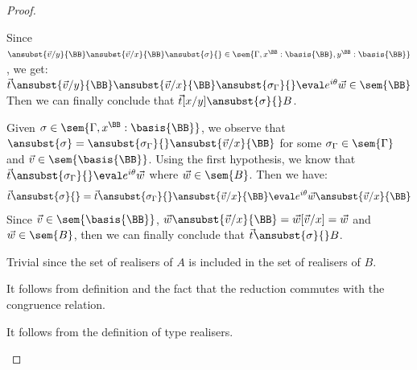 \begin{proof}
\begin{description}
    Since $\ansubst{\vec{v}/y}{\BB}\ansubst{\vec{v}/x}{\BB}\ansubst{\sigma}{}\in\sem{\Gamma, x^\BB:\basis{\BB}, y^\BB:\basis{\BB}}$, we get: $\vec{t}\ansubst{\vec{v}/y}{\BB}\ansubst{\vec{v}/x}{\BB}\\\ansubst{\sigma_\Gamma}{}\eval e^{i\theta}\vec{w}\in\sem{\BB}$
    Then we can finally conclude that $\vec{t}[x/y]\ansubst{\sigma}{}\real B$.

    \item[Weak] Given $\sigma\in\sem{\Gamma,x^\BB:\basis{\BB}}$, we observe that $\ansubst{\sigma}=\ansubst{\sigma_\Gamma}{}\ansubst{\vec{v}/x}{\BB}$ for some $\sigma_\Gamma\in\sem{\Gamma}$ and $\vec{v}\in\sem{\basis{\BB}}$. Using the first hypothesis, we know that $\vec{t}\ansubst{\sigma_\Gamma}{}\eval e^{i\theta}\vec{w}$ where $\vec{w}\in\sem{B}$. Then we have:
    \[
    \vec{t}\ansubst{\sigma}{}=\vec{t}\ansubst{\sigma_\Gamma}{}\ansubst{\vec{v}/x}{\BB}\eval e^{i\theta}\vec{w}\ansubst{\vec{v}/x}{\BB}
    \]
    Since $\vec{v}\in\sem{\basis{\BB}}$, $\vec{w}\ansubst{\vec{v}/x}{\BB}=\vec{w}[\vec{v}/x]=\vec{w}$ and $\vec{w}\in\sem{B}$, then we can finally conclude that $\vec{t}\ansubst{\sigma}{}\real B$.
    
    \item[Sub] Trivial since the set of realisers of ${A}$ is included in the set of realisers of ${B}$. 

    \item[Equiv] It follows from definition and the fact that the reduction commutes with the congruence relation.
    
    \item[Phase] It follows from the definition of type realisers.
      \qedhere
    \end{description}
\end{proof}

